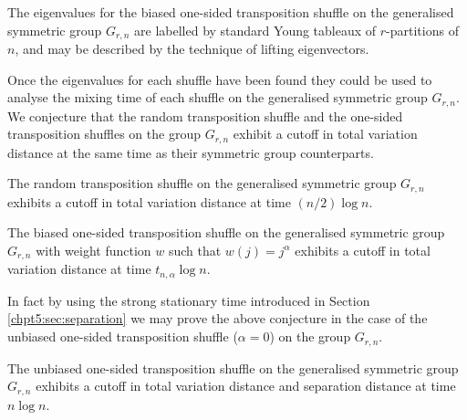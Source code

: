 \documentclass[11pt]{report}
\begin{document}
\begin{conj}
	The eigenvalues for the biased one-sided transposition shuffle on the  generalised symmetric group $G_{r,n}$ are labelled by standard Young tableaux of $r$-partitions of $n$, and may be described by the technique of lifting eigenvectors.
\end{conj}

Once the eigenvalues for each shuffle have been found they could be used to analyse the mixing time of each shuffle on the generalised symmetric group $G_{r,n}$. We conjecture that the random transposition shuffle and the one-sided transposition shuffles on the group $G_{r,n}$ exhibit a cutoff in total variation distance at the same time as their symmetric group counterparts.

\begin{conj}
	The random transposition shuffle on the generalised symmetric group $G_{r,n}$ exhibits a cutoff in total variation distance at time $(n/2) \log n$.
\end{conj}

\begin{conj}
	The biased one-sided transposition shuffle on the generalised symmetric group $G_{r,n}$ with weight function $w$ such that $w(j) = j^\alpha$ exhibits a cutoff in total variation distance at time $t_{n,\alpha} \log n$.
\end{conj}

In fact by using the strong stationary time introduced in Section \ref{chpt5:sec:separation} we may prove the above conjecture in the case of the unbiased one-sided transposition shuffle ($\alpha=0$) on the group $G_{r,n}$.
\begin{thm}
	The unbiased one-sided transposition shuffle on the  generalised symmetric group $G_{r,n}$ exhibits a cutoff in total variation distance and separation distance at time $ n \log n$.
\end{thm}
\end{document}
